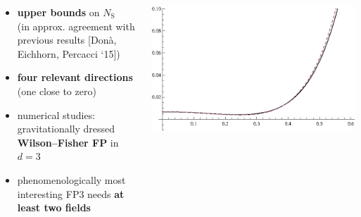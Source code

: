 \documentclass[]{beamer}  %
\newcommand\NS{ N_{\scriptscriptstyle{\mathrm{S}}} }
\begin{document}
\begin{frame}
  \begin{columns}[T]
    \begin{column}{.5\textwidth}
      \begin{itemize}
        \item \textbf{upper bounds} on $\NS$\\[1pt]
          (in approx. agreement with previous results [Don\`a, Eichhorn, Percacci `15])\\[7pt]
        \item \textbf{four relevant directions} (one close to zero)\\[7pt]
        \item numerical studies: gravitationally dressed \textbf{Wilson--Fisher FP} in $d=3$\\[7pt]
        \item phenomenologically most interesting FP3 needs \textbf{at least two fields}
      \end{itemize}
    \end{column}
    \begin{column}{.5\textwidth}
      \begin{center}
        \vspace{-10pt}
        \includegraphics[scale=0.6]{wilson_fisher_gravity.eps}
      \end{center}
    \end{column}
  \end{columns}

\end{frame}


\end{document}
